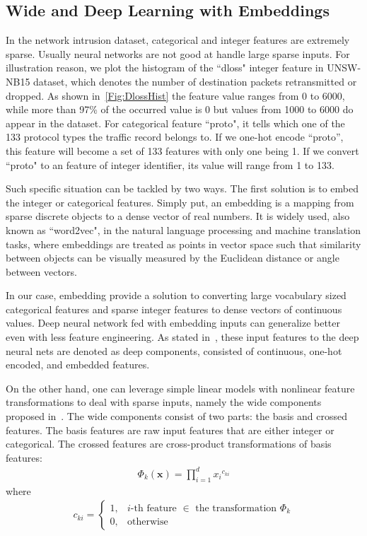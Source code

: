 \subsection{Wide and Deep Learning with Embeddings}
\label{SubSec:WD}
In the network intrusion dataset, categorical and integer features are extremely sparse.
Usually neural networks are not good at handle large sparse inputs.
For illustration reason, we plot the histogram of the ``dloss" integer feature in UNSW-NB15 dataset,
which denotes the number of destination packets retransmitted or dropped.
As shown in~\ref{Fig:DlossHist} the feature value ranges from 0 to 6000, while more than 97\%
of the occurred value is 0 but values from 1000 to 6000 do appear in the dataset.
For categorical feature ``proto", it tells which one of the 133 protocol types the traffic record belongs to.
If we one-hot encode ``proto'', this feature will become a set of 133 features with only one being 1.
If we convert ``proto" to an feature of integer identifier, its value will range from 1 to 133.

Such specific situation can be tackled by two ways.
The first solution is to embed the integer or categorical features. %
Simply put, an embedding is a mapping from sparse discrete objects to a dense vector of real numbers.
It is widely used, also known as ``word2vec", in the natural language processing and machine translation tasks,
where embeddings are treated as points in vector space such that similarity between objects can be visually measured
by the Euclidean distance or angle between vectors.

In our case, embedding provide a solution to converting large vocabulary sized categorical features
and sparse integer features to dense vectors of continuous values.
Deep neural network fed with embedding inputs can generalize better even with less feature engineering.
As stated in~\cite{WideDeepModel}, these input features to the deep neural nets are denoted as deep components,
consisted of continuous, one-hot encoded, and embedded features.

On the other hand, one can leverage simple linear models with nonlinear feature transformations to deal with sparse inputs,
namely the wide components proposed in~\cite{WideDeepModel}.
The wide components consist of two parts: the basis and crossed features.
The basis features are raw input features that are either integer or categorical.
The crossed features are cross-product transformations of basis features:
\begin{align}
    \Phi_k (\bm{x} ) = \prod_{i=1}^{d} {x_i}^{c_{ki}}
\end{align}
where
\begin{align}
    c_{ki} = 
    \begin{cases}
        1, & \text{$i$-th feature $\in$ the transformation $\Phi_k$} \\
        0, & \text{otherwise}
    \end{cases}
\end{align}

